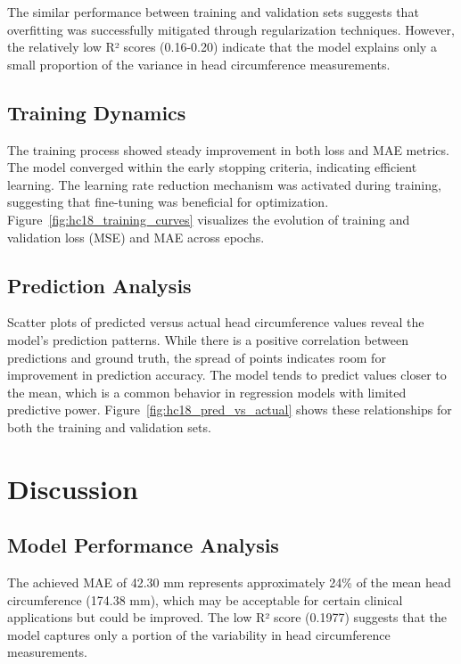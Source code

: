 \documentclass[conference]{IEEEtran}
\begin{document}
The similar performance between training and validation sets suggests that overfitting was successfully mitigated through regularization techniques. However, the relatively low R² scores (0.16-0.20) indicate that the model explains only a small proportion of the variance in head circumference measurements.

\subsection{Training Dynamics}

The training process showed steady improvement in both loss and MAE metrics. The model converged within the early stopping criteria, indicating efficient learning. The learning rate reduction mechanism was activated during training, suggesting that fine-tuning was beneficial for optimization. Figure~\ref{fig:hc18_training_curves} visualizes the evolution of training and validation loss (MSE) and MAE across epochs.

\subsection{Prediction Analysis}

Scatter plots of predicted versus actual head circumference values reveal the model's prediction patterns. While there is a positive correlation between predictions and ground truth, the spread of points indicates room for improvement in prediction accuracy. The model tends to predict values closer to the mean, which is a common behavior in regression models with limited predictive power. Figure~\ref{fig:hc18_pred_vs_actual} shows these relationships for both the training and validation sets.

\section{Discussion}

\subsection{Model Performance Analysis}

The achieved MAE of 42.30 mm represents approximately 24\% of the mean head circumference (174.38 mm), which may be acceptable for certain clinical applications but could be improved. The low R² score (0.1977) suggests that the model captures only a portion of the variability in head circumference measurements.
\end{document}
